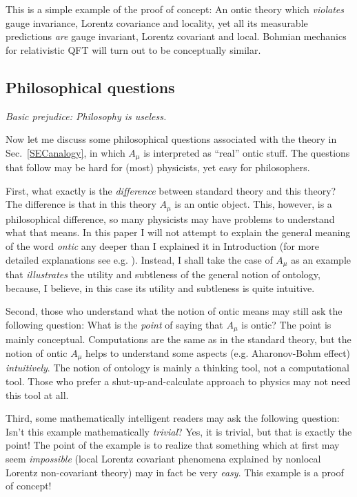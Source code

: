 \documentclass[12pt]{article}
\begin{document}
This is a simple example of the proof of concept: 
An ontic theory which {\em violates} gauge invariance, 
Lorentz covariance and locality, yet all its measurable predictions 
{\em are} gauge invariant, Lorentz covariant and local.
Bohmian mechanics for relativistic QFT will turn out to be conceptually similar.

\subsection{Philosophical questions}

\begin{flushright}
{\it Basic prejudice: Philosophy is useless.} 
\end{flushright}

Now let me discuss some philosophical questions associated with the theory in Sec.~\ref{SECanalogy},
in which $A_{\mu}$ is interpreted as ``real'' ontic stuff.
The questions that follow may be hard for (most) physicists, yet easy for philosophers. 

First, what exactly is the {\em difference} between standard theory and this theory? 
The difference is that in this theory $A_{\mu}$ is an ontic object.
This, however, is a philosophical difference, so many physicists may have problems
to understand what that means. In this paper I will not attempt to explain the general meaning of the word {\em ontic}
any deeper than I explained it in Introduction (for more detailed explanations see e.g. \cite{norsen-book,durr-book2}).
Instead, I shall take the case of $A_{\mu}$ as an example that {\em illustrates} 
the utility and subtleness of the general notion of 
ontology, because, I believe, in this case its utility and subtleness is quite intuitive.
  
Second, those who understand what the notion of ontic means may still
ask the following question: What is the {\em point} of saying that $A_{\mu}$ is ontic? 
The point is mainly conceptual. Computations are the same as in the standard theory, but 
the notion of ontic $A_{\mu}$ 
helps to understand some aspects (e.g. Aharonov-Bohm effect) {\em intuitively}. 
The notion of ontology is mainly a thinking tool, not a computational tool. 
Those who prefer a shut-up-and-calculate approach to physics may not need this tool at all. 
 
Third, some mathematically intelligent readers may ask the following question:
Isn't this example mathematically {\em trivial}? 
Yes, it is trivial, but that is exactly the point! 
The point of the example is to realize that something which at first may seem {\em impossible} 
(local Lorentz covariant phenomena explained by nonlocal Lorentz non-covariant theory)
may in fact be very {\em easy}. 
This example is a proof of concept!
\end{document}
